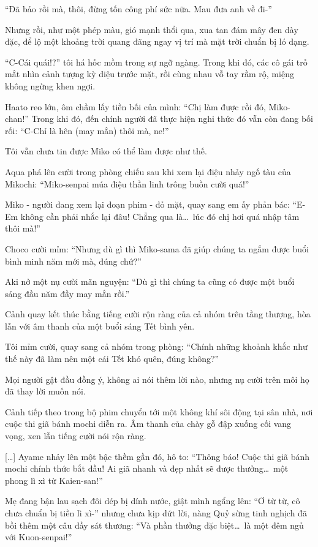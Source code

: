 \documentclass[../main.tex]{subfiles}
\begin{document}
``Đã bảo rồi mà, thôi, đừng tốn công phí sức nữa. Mau đưa anh về đi-''

Nhưng rồi, như một phép màu, gió mạnh thổi qua, xua tan đám mây đen dày đặc, để lộ một khoảng trời quang đãng ngay vị trí mà mặt trời chuẩn bị ló dạng.

``C-Cái quái!?'' tôi há hốc mồm trong sự ngỡ ngàng. Trong khi đó, các cô gái trố mắt nhìn cảnh tượng kỳ diệu trước mặt, rồi cùng nhau vỗ tay rầm rộ, miệng không ngừng khen ngợi.

Haato reo lớn, ôm chầm lấy tiền bối của mình: ``Chị làm được rồi đó, Miko-chan!'' Trong khi đó, đến chính người đã thực hiện nghi thức đó vẫn còn đang bối rối: ``C-Chỉ là hên (may mắn) thôi mà, ne!''

Tôi vẫn chưa tin được Miko có thể làm được như thế.

\il

Aqua phá lên cười trong phòng chiếu sau khi xem lại điệu nhảy ngố tàu của Mikochi: ``Miko-senpai múa điệu thần linh trông buồn cười quá!''

Miko - người đang xem lại đoạn phim - đỏ mặt, quay sang em ấy phản bác: ``E-Em không cần phải nhắc lại đâu! Chẳng qua là\dots\ lúc đó chị hơi quá nhập tâm thôi mà!''

Choco cười mỉm: ``Nhưng dù gì thì Miko-sama đã giúp chúng ta ngắm được buổi bình minh năm mới mà, đúng chứ?''

Aki nở một nụ cười mãn nguyện: ``Dù gì thì chúng ta cũng có được một buổi sáng đầu năm đầy may mắn rồi.''

Cảnh quay kết thúc bằng tiếng cười rộn ràng của cả nhóm trên tầng thượng, hòa lẫn với âm thanh của một buổi sáng Tết bình yên.

Tôi mỉm cười, quay sang cả nhóm trong phòng: ``Chính những khoảnh khắc như thế này đã làm nên một cái Tết khó quên, đúng không?''

Mọi người gật đầu đồng ý, không ai nói thêm lời nào, nhưng nụ cười trên môi họ đã thay lời muốn nói.

Cảnh tiếp theo trong bộ phim chuyển tới một không khí sôi động tại sân nhà, nơi cuộc thi giã bánh mochi diễn ra. Âm thanh của chày gỗ đập xuống cối vang vọng, xen lẫn tiếng cười nói rộn ràng.

\il

[\dots] Ayame nhảy lên một bậc thềm gần đó, hô to: ``Thông báo! Cuộc thi giã bánh mochi chính thức bắt đầu! Ai giã nhanh và đẹp nhất sẽ được thưởng\dots\ một phong lì xì từ Kaien-san!''

Mẹ đang bận lau sạch đôi dép bị dính nước, giật mình ngẩng lên: ``Ơ từ từ, cô chưa chuẩn bị tiền lì xì-'' nhưng chưa kịp dứt lời, nàng Quỷ sừng tinh nghịch đã bồi thêm một câu đầy sát thương: ``Và phần thưởng đặc biệt\dots\ là một đêm ngủ với Kuon-senpai!''
\end{document}
